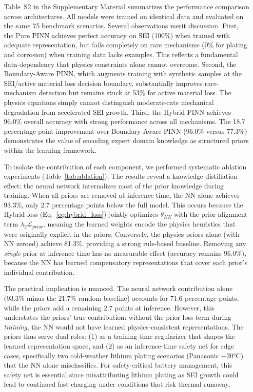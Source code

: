 \documentclass[5p,times,authoryear]{elsarticle}
\begin{document}
Table~S2 in the Supplementary Material summarizes the performance comparison across architectures. All models were trained on identical data and evaluated on the same 75 benchmark scenarios.
Several observations merit discussion. First, the Pure PINN achieves perfect accuracy on SEI (100\%) when trained with adequate representation, but fails completely on rare mechanisms (0\% for plating and corrosion) when training data lacks examples. This reflects a fundamental data-dependency that physics constraints alone cannot overcome.
Second, the Boundary-Aware PINN, which augments training with synthetic samples at the SEI/active material loss decision boundary, substantially improves rare-mechanism detection but remains stuck at 53\% for active material loss. The physics equations simply cannot distinguish moderate-rate mechanical degradation from accelerated SEI growth.
Third, the Hybrid PINN achieves 96.0\% overall accuracy with strong performance across all mechanisms. The 18.7 percentage point improvement over Boundary-Aware PINN (96.0\% versus 77.3\%) demonstrates the value of encoding expert domain knowledge as structured priors within the learning framework.


To isolate the contribution of each component, we performed systematic ablation experiments (Table~\ref{tab:ablation}). The results reveal a knowledge distillation effect: the neural network internalizes most of the prior knowledge during training. When all priors are removed at inference time, the NN alone achieves 93.3\%, only 2.7 percentage points below the full model. This occurs because the Hybrid loss (Eq.~\ref{eq:hybrid_loss}) jointly optimizes $\theta_{NN}$ with the prior alignment term $\lambda_2 \mathcal{L}_{prior}$, meaning the learned weights encode the physics heuristics that were originally explicit in the priors. Conversely, the physics priors alone (with NN zeroed) achieve 81.3\%, providing a strong rule-based baseline. Removing any \textit{single} prior at inference time has no measurable effect (accuracy remains 96.0\%), because the NN has learned compensatory representations that cover each prior's individual contribution.

The practical implication is nuanced. The neural network contribution alone (93.3\% minus the 21.7\% random baseline) accounts for 71.6 percentage points, while the priors add a remaining 2.7 points at inference. However, this understates the priors' true contribution: without the prior loss term during \textit{training}, the NN would not have learned physics-consistent representations. The priors thus serve dual roles: (1) as a training-time regularizer that shapes the learned representation space, and (2) as an inference-time safety net for edge cases, specifically two cold-weather lithium plating scenarios (Panasonic $-20$°C) that the NN alone misclassifies. For safety-critical battery management, this safety net is essential since misattributing lithium plating as SEI growth could lead to continued fast charging under conditions that risk thermal runaway.
\end{document}
